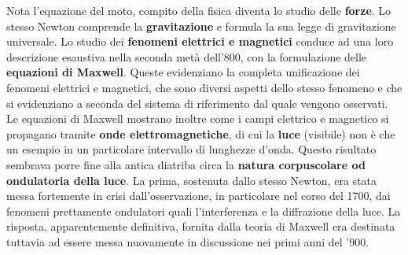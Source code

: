 Nota l'equazione del moto, compito della fisica diventa lo studio delle \textbf{forze}.
Lo stesso Newton comprende la \textbf{gravitazione} e formula la sua legge di gravitazione universale.
Lo studio dei \textbf{fenomeni elettrici e magnetici} conduce ad una loro descrizione esaustiva nella seconda metà dell'800, con la formulazione delle \textbf{equazioni di Maxwell}. Queste evidenziano la completa unificazione dei fenomeni elettrici e magnetici, che sono diversi aspetti dello stesso fenomeno e che si evidenziano a seconda del sistema di riferimento dal quale vengono osservati.\\
Le equazioni di Maxwell mostrano inoltre come i campi elettrico e magnetico si propagano tramite \textbf{onde elettromagnetiche}, di cui la \textbf{luce} (visibile) non è che un esempio in un particolare intervallo di lunghezze d'onda. Questo risultato sembrava porre fine alla antica diatriba circa la \textbf{natura corpuscolare od ondulatoria della luce}. La prima, sostenuta dallo stesso Newton, era stata messa fortemente in crisi dall'osservazione, in particolare nel corso del 1700, dai fenomeni prettamente ondulatori quali l'interferenza e la diffrazione della luce. La risposta, apparentemente definitiva, fornita dalla teoria di Maxwell era destinata tuttavia ad essere messa nuovamente in discussione nei primi anni del '900.

